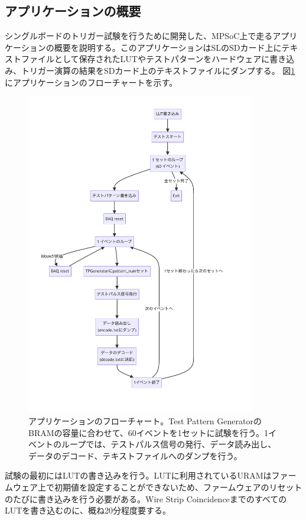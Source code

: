 \subsection*{アプリケーションの概要}
\par
シングルボードのトリガー試験を行うために開発した、MPSoC上で走るアプリケーションの概要を説明する。このアプリケーションはSLのSDカード上にテキストファイルとして保存されたLUTやテストパターンをハードウェアに書き込み、トリガー演算の結果をSDカード上のテキストファイルにダンプする。
図\ref{Flowchart}にアプリケーションのフローチャートを示す。

\begin{figure} 
\centering
\includegraphics[width=10cm]{fig/Test/Flowchart.pdf}
\caption[アプケーションのフローチャート]{アプリケーションのフローチャート。Test Pattern GeneratorのBRAMの容量に合わせて、60イベントを1セットに試験を行う。1イベントのループでは、テストパルス信号の発行、データ読み出し、データのデコード、テキストファイルへのダンプを行う。}
\label{Flowchart}
\end{figure}

試験の最初にはLUTの書き込みを行う。LUTに利用されているURAMはファームウェア上で初期値を設定することができないため、ファームウェアのリセットのたびに書き込みを行う必要がある。Wire Strip CoincidenceまでのすべてのLUTを書き込むのに、概ね20分程度要する。

